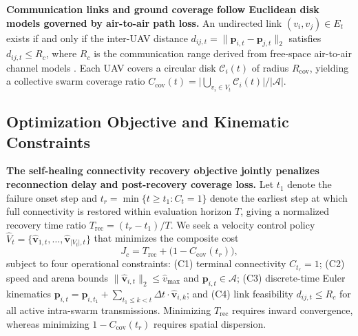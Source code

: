 \documentclass[11pt]{article}
\theoremstyle{plain}
\theoremstyle{definition}
\theoremstyle{remark}
\begin{document}
\textbf{Communication links and ground coverage follow Euclidean disk models governed by air-to-air path loss.} An undirected link $(v_i, v_j) \in E_t$ exists if and only if the inter-UAV distance $d_{ij,t} = \|\mathbf{p}_{i,t} - \mathbf{p}_{j,t}\|_2$ satisfies $d_{ij,t} \le R_c$, where $R_c$ is the communication range derived from free-space air-to-air channel models \citep{ma2019wideband,ni2024path,wang2025flight}. Each UAV covers a circular disk $\mathcal{C}_i(t)$ of radius $R_{\mathrm{cov}}$, yielding a collective swarm coverage ratio $C_{\mathrm{cov}}(t) = \bigl|\bigcup_{v_i \in V_t} \mathcal{C}_i(t)\bigr| / |\mathcal{A}|$.

\subsection{Optimization Objective and Kinematic Constraints}
\textbf{The self-healing connectivity recovery objective jointly penalizes reconnection delay and post-recovery coverage loss.} Let $t_1$ denote the failure onset step and $t_r = \min\{t \ge t_1 : C_t = 1\}$ denote the earliest step at which full connectivity is restored within evaluation horizon $T$, giving a normalized recovery time ratio $T_{\mathrm{rec}} = (t_r - t_1)/T$. We seek a velocity control policy $\hat{V}_t = \{\hat{\mathbf{v}}_{1,t}, \dots, \hat{\mathbf{v}}_{|V_t|,t}\}$ that minimizes the composite cost
\begin{equation}
  J_c = T_{\mathrm{rec}} + \bigl(1 - C_{\mathrm{cov}}(t_r)\bigr),
  \label{eq:objective}
\end{equation}
subject to four operational constraints: (C1) terminal connectivity $C_{t_r} = 1$; (C2) speed and arena bounds $\|\hat{\mathbf{v}}_{i,t}\|_2 \le \hat{v}_{\max}$ and $\mathbf{p}_{i,t} \in \mathcal{A}$; (C3) discrete-time Euler kinematics $\mathbf{p}_{i,t} = \mathbf{p}_{i,t_1} + \sum_{t_1 \le k < t} \Delta t \cdot \hat{\mathbf{v}}_{i,k}$; and (C4) link feasibility $d_{ij,t} \le R_c$ for all active intra-swarm transmissions. Minimizing $T_{\mathrm{rec}}$ requires inward convergence, whereas minimizing $1 - C_{\mathrm{cov}}(t_r)$ requires spatial dispersion.
\end{document}
